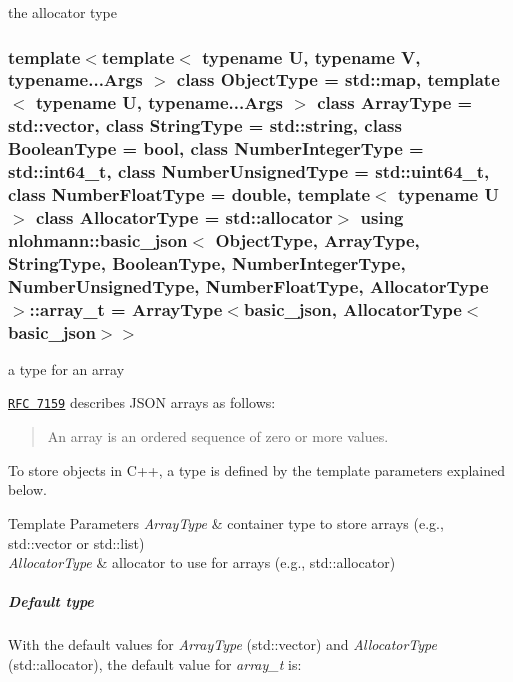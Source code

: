 the allocator type 

\hypertarget{classnlohmann_1_1basic__json_ab00b882d39306d663c23dab110f5cae0}{
\subsubsection[{array\-\_\-t}]{\setlength{\rightskip}{0pt plus 5cm}template$<$template$<$ typename U, typename V, typename...\-Args $>$ class Object\-Type = std\-::map, template$<$ typename U, typename...\-Args $>$ class Array\-Type = std\-::vector, class String\-Type  = std\-::string, class Boolean\-Type  = bool, class Number\-Integer\-Type  = std\-::int64\-\_\-t, class Number\-Unsigned\-Type  = std\-::uint64\-\_\-t, class Number\-Float\-Type  = double, template$<$ typename U $>$ class Allocator\-Type = std\-::allocator$>$ using {\bf nlohmann\-::basic\-\_\-json}$<$ Object\-Type, Array\-Type, String\-Type, Boolean\-Type, Number\-Integer\-Type, Number\-Unsigned\-Type, Number\-Float\-Type, Allocator\-Type $>$\-::{\bf array\-\_\-t} =  Array\-Type$<${\bf basic\-\_\-json}, Allocator\-Type$<${\bf basic\-\_\-json}$>$$>$}}\label{classnlohmann_1_1basic__json_ab00b882d39306d663c23dab110f5cae0}


a type for an array 

\href{http://rfc7159.net/rfc7159}{\tt R\-F\-C 7159} describes J\-S\-O\-N arrays as follows\-: \begin{quotation}
An array is an ordered sequence of zero or more values.

\end{quotation}


To store objects in C++, a type is defined by the template parameters explained below.


\begin{DoxyTemplParams}{Template Parameters}
{\em Array\-Type} & container type to store arrays (e.\-g., {\ttfamily std\-::vector} or {\ttfamily std\-::list}) \\
\hline
{\em Allocator\-Type} & allocator to use for arrays (e.\-g., {\ttfamily std\-::allocator})\\
\hline
\end{DoxyTemplParams}
\subparagraph*{Default type}

With the default values for {\itshape Array\-Type} ({\ttfamily std\-::vector}) and {\itshape Allocator\-Type} ({\ttfamily std\-::allocator}), the default value for {\itshape array\-\_\-t} is\-:


